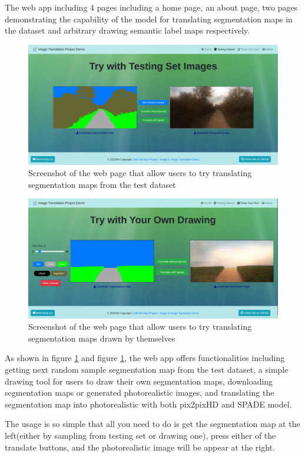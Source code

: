 The web app including 4 pages including a home page, an about page, two pages demonstrating
the capability of the model for translating segmentation maps in the dataset and arbitrary 
drawing semantic label maps respectively. 

\begin{figure}[H]
    \begin{center}
    \includegraphics[width=14cm]{figures/GUI-testset}
    \end{center}
    \caption{Screenshot of the web page that allow users to try translating segmentation maps from the test dataset}
    \label{fig:GUI-testset}
\end{figure}

\begin{figure}[H]
    \begin{center}
    \includegraphics[width=14cm]{figures/GUI-draw}
    \end{center}
    \caption{Screenshot of the web page that allow users to try translating segmentation maps drawn by themselves}
    \label{fig:GUI-draw}
\end{figure}

As shown in figure \ref{fig:GUI-testset} and figure \ref{fig:GUI-testset}, 
the web app offers functionalities including getting next random sample segmentation map from 
the test dataset, a simple drawing tool for users to draw their own segmentation maps, 
downloading segmentation maps or generated photorealistic images, and translating the segmentation
map into photorealistic with both pix2pixHD and SPADE model.

The usage is so simple that all you need to do is get the segmentation map 
at the left(either by sampling from testing set or drawing one), press either of the 
translate buttons, and the photorealistic image will be appear at the right.


